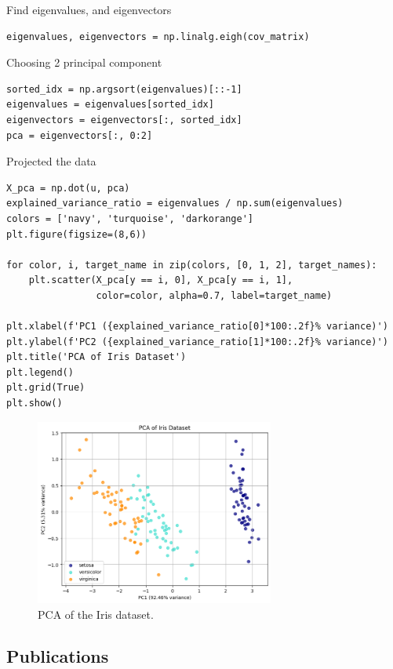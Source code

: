 \documentclass[a4paper,12pt]{article}
\begin{document}
Find eigenvalues, and eigenvectors
\begin{lstlisting}
eigenvalues, eigenvectors = np.linalg.eigh(cov_matrix)
\end{lstlisting}

Choosing 2 principal component
\begin{lstlisting}
sorted_idx = np.argsort(eigenvalues)[::-1]
eigenvalues = eigenvalues[sorted_idx]
eigenvectors = eigenvectors[:, sorted_idx]
pca = eigenvectors[:, 0:2]
\end{lstlisting}

Projected the data
\begin{lstlisting}
X_pca = np.dot(u, pca)
explained_variance_ratio = eigenvalues / np.sum(eigenvalues)
colors = ['navy', 'turquoise', 'darkorange']
plt.figure(figsize=(8,6))

for color, i, target_name in zip(colors, [0, 1, 2], target_names):
    plt.scatter(X_pca[y == i, 0], X_pca[y == i, 1], 
                color=color, alpha=0.7, label=target_name)

plt.xlabel(f'PC1 ({explained_variance_ratio[0]*100:.2f}% variance)')
plt.ylabel(f'PC2 ({explained_variance_ratio[1]*100:.2f}% variance)')
plt.title('PCA of Iris Dataset')
plt.legend()
plt.grid(True)
plt.show()
\end{lstlisting}

\begin{figure}[h]
    \centering
    \includegraphics[width=0.7\textwidth]{pca.png}
    \caption{PCA of the Iris dataset.}
    \label{fig:pca}
\end{figure}

\pagebreak

\subsection{Publications}
\end{document}
